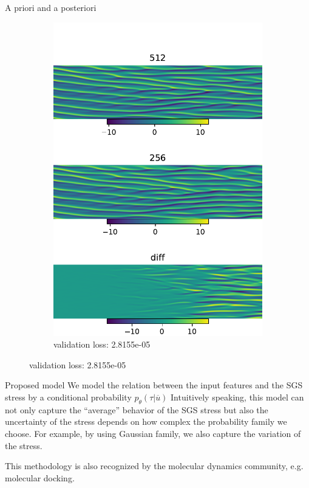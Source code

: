 \documentclass[paper slide]{beamer}
\begin{document}
\begin{frame}{A priori and a posteriori}
\begin{figure}[ht]
\begin{subfigure}[b]{0.32\textwidth}
			\includegraphics[width=\textwidth]{fig/ks_nu0.1_N1512N2256_correct_cmp_lr5e-4.pdf} 
			\caption{validation loss: 2.8155e-05}  
		\end{subfigure}
	\end{figure}
\end{frame}


\begin{frame}{Proposed model}
	We model the relation between the input features and the SGS stress by
	a conditional probability $p_{\theta}(\tau | \overline{u})$
	Intuitively speaking, this model can not only capture the ``average''
	behavior of the SGS stress but also the {\color{red}uncertainty} of the
	stress depends on how complex the probability family we choose. For
	example, by using Gaussian family, we also capture the variation of the
	stress.

	This methodology is also recognized by the molecular dynamics community,
	e.g. molecular docking.
\end{frame}
\end{document}
